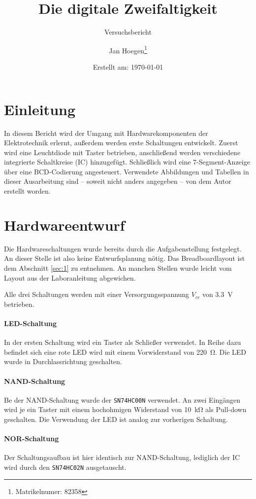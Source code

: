 \documentclass[
    paper=a4,
]{scrartcl}
\title{Die digitale Zweifaltigkeit}
\subtitle{Versuchsbericht}
\author{Jan Hoegen\thanks{Matrikelnumer: 82358}}
\date{Erstellt am: \today}
\begin{document}
\maketitle

\tableofcontents

\newpage

\section{Einleitung}
    In diesem Bericht wird der Umgang mit  Hardwarekomponenten der Elektrotechnik erlernt, außerdem werden erste Schaltungen entwickelt. Zuerst wird eine Leuchtdiode mit Taster betrieben, anschließend werden verschiedene integrierte Schaltkreise (IC) hinzugefügt. Schließlich wird eine 7-Segment-Anzeige über eine BCD-Codierung angesteuert. Verwendete Abbildungen und Tabellen in dieser Ausarbeitung sind -- soweit nicht anders angegeben -- von dem Autor erstellt worden.
    
\section{Hardwareentwurf}
    Die Hardwareschaltungen wurde bereits durch die Aufgabenstellung festgelegt. An dieser Stelle ist also keine Entwurfsplanung nötig. Das Breadboardlayout ist dem Abschnitt \ref{sec:1} zu entnehmen. An manchen Stellen wurde leicht vom Layout aus der Laboranleitung abgewichen.

    Alle drei Schaltungen werden mit einer Versorgungsspannung \(V_{cc}\) von \SI{3.3}{\volt} betrieben. 

    \paragraph{LED-Schaltung}
        In der ersten Schaltung wird ein Taster als Schließer verwendet. In Reihe dazu befindet sich eine rote LED wird mit einem Vorwiderstand von \SI{220}{\ohm}. Die LED wurde in Durchlassrichtung geschalten.

    \paragraph{NAND-Schaltung}
        Be der NAND-Schaltung wurde der \texttt{SN74HC00N} verwendet. An zwei Eingängen wird je ein Taster mit einem hochohmigen Widerstand von \SI{10}{\kilo\ohm} als Pull-down geschalten. Die Verwendung der LED ist analog zur vorherigen Schaltung.

    \paragraph{NOR-Schaltung}
        Der Schaltungsaufbau ist hier identisch zur NAND-Schaltung, lediglich der IC wird durch den \texttt{SN74HC02N} ausgetauscht.
\end{document}
